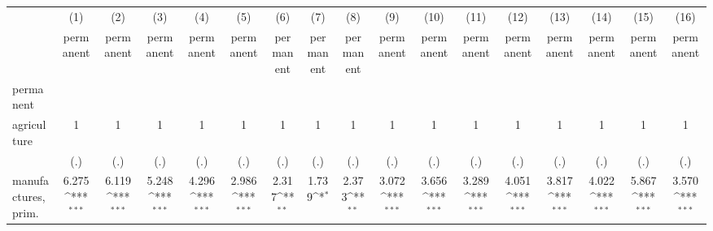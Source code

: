 {
\def\sym#1{\ifmmode^{#1}\else\(^{#1}\)\fi}
\begin{tabular}{l*{16}{c}}
\hline\hline
                    &\multicolumn{1}{c}{(1)}&\multicolumn{1}{c}{(2)}&\multicolumn{1}{c}{(3)}&\multicolumn{1}{c}{(4)}&\multicolumn{1}{c}{(5)}&\multicolumn{1}{c}{(6)}&\multicolumn{1}{c}{(7)}&\multicolumn{1}{c}{(8)}&\multicolumn{1}{c}{(9)}&\multicolumn{1}{c}{(10)}&\multicolumn{1}{c}{(11)}&\multicolumn{1}{c}{(12)}&\multicolumn{1}{c}{(13)}&\multicolumn{1}{c}{(14)}&\multicolumn{1}{c}{(15)}&\multicolumn{1}{c}{(16)}\\
                    &\multicolumn{1}{c}{permanent}&\multicolumn{1}{c}{permanent}&\multicolumn{1}{c}{permanent}&\multicolumn{1}{c}{permanent}&\multicolumn{1}{c}{permanent}&\multicolumn{1}{c}{permanent}&\multicolumn{1}{c}{permanent}&\multicolumn{1}{c}{permanent}&\multicolumn{1}{c}{permanent}&\multicolumn{1}{c}{permanent}&\multicolumn{1}{c}{permanent}&\multicolumn{1}{c}{permanent}&\multicolumn{1}{c}{permanent}&\multicolumn{1}{c}{permanent}&\multicolumn{1}{c}{permanent}&\multicolumn{1}{c}{permanent}\\
\hline
permanent           &                     &                     &                     &                     &                     &                     &                     &                     &                     &                     &                     &                     &                     &                     &                     &                     \\
agriculture         &           1         &           1         &           1         &           1         &           1         &           1         &           1         &           1         &           1         &           1         &           1         &           1         &           1         &           1         &           1         &           1         \\
                    &         (.)         &         (.)         &         (.)         &         (.)         &         (.)         &         (.)         &         (.)         &         (.)         &         (.)         &         (.)         &         (.)         &         (.)         &         (.)         &         (.)         &         (.)         &         (.)         \\
[1em]
manufactures, prim. &       6.275\sym{***}&       6.119\sym{***}&       5.248\sym{***}&       4.296\sym{***}&       2.986\sym{***}&       2.317\sym{**} &       1.739\sym{*}  &       2.373\sym{**} &       3.072\sym{***}&       3.656\sym{***}&       3.289\sym{***}&       4.051\sym{***}&       3.817\sym{***}&       4.022\sym{***}&       5.867\sym{***}&       3.570\sym{***}\\

\end{tabular}}
